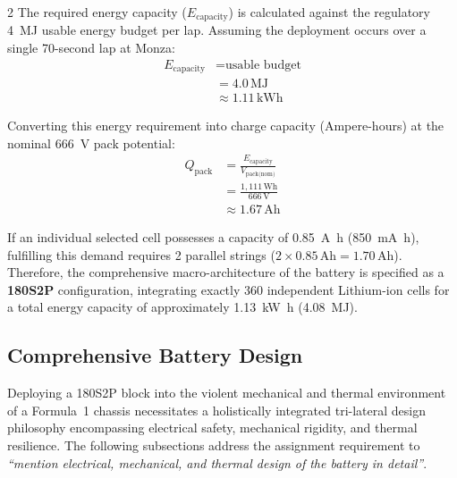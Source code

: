 \begin{multicols}{2}
The required energy capacity ($E_{\text{capacity}}$) is calculated against the regulatory \SI{4}{\mega\joule} usable energy budget per lap. Assuming the deployment occurs over a single 70-second lap at Monza:
\begin{equation} \label{eq:energy_capacity}
\begin{split}
E_{\text{capacity}} &= \text{usable budget} \\
&= 4.0\,\mathrm{MJ} \\
&\approx 1.11\,\mathrm{kWh}
\end{split}
\end{equation}

Converting this energy requirement into charge capacity (Ampere-hours) at the nominal \SI{666}{\volt} pack potential:
\begin{equation} \label{eq:ah_capacity}
\begin{split}
Q_{\text{pack}} &= \frac{E_{\text{capacity}}}{V_{\text{pack(nom)}}} \\
&= \frac{1{,}111\,\mathrm{Wh}}{666\,\mathrm{V}} \\
&\approx 1.67\,\mathrm{Ah}
\end{split}
\end{equation}

If an individual selected cell possesses a capacity of \SI{0.85}{\ampere\hour} (\SI{850}{\milli\ampere\hour}), fulfilling this demand requires 2 parallel strings ($2 \times 0.85\,\mathrm{Ah} = 1.70\,\mathrm{Ah}$). Therefore, the comprehensive macro-architecture of the battery is specified as a \textbf{180S2P} configuration, integrating exactly 360 independent Lithium-ion cells for a total energy capacity of approximately \SI{1.13}{\kilo\watt\hour} (\SI{4.08}{\mega\joule}).

\subsection{Comprehensive Battery Design}

Deploying a 180S2P block into the violent mechanical and thermal environment of a Formula~1 chassis necessitates a holistically integrated tri-lateral design philosophy encompassing electrical safety, mechanical rigidity, and thermal resilience. The following subsections address the assignment requirement to \textit{``mention electrical, mechanical, and thermal design of the battery in detail''}.


\end{multicols}
